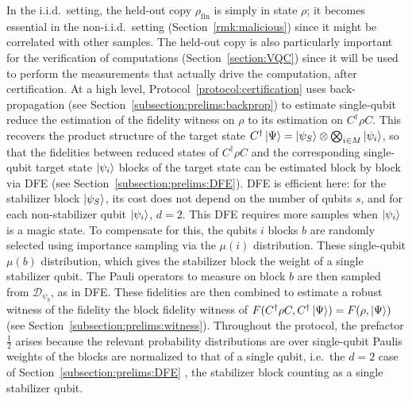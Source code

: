 \documentclass[a4paper,twocolumn,11pt,unpublished]{../../revision/quantumarticle}
\providecommand{\DIFadd}[1]{{\protect\color{blue} \sf #1}} %
\providecommand{\DIFdel}[1]{{\protect\color{red} \scriptsize #1}} %
\providecommand{\DIFaddbegin}{} %
\providecommand{\DIFaddend}{} %
\providecommand{\DIFdelbegin}{} %
\providecommand{\DIFdelend}{} %
\begin{document}
        In the i.i.d.\ setting, the held-out copy $\rho_{\mathrm{fin}}$ is simply in state $\rho$; it becomes essential in the non-i.i.d.\ setting (Section~\ref{rmk:malicious}) since it might be correlated with other samples. The held-out copy is also particularly important for the verification of computations (Section~\ref{section:VQC}) since it will be used to perform the measurements that actually drive the computation, after certification. At a high level, Protocol~\ref{protocol:certification} uses back-propagation (see Section~\ref{subsection:prelims:backprop}) to \DIFdelbegin \DIFdel{estimate single-qubit }\DIFdelend \DIFaddbegin \DIFadd{reduce the estimation of the fidelity witness on $\rho$ to its estimation on $C^\dag\rho C$. This recovers the product structure of the target state $C^\dag\ket\Psi=\ket{\psi_S}\otimes\bigotimes_{i\in M}\ket{\psi_i}$, so that the }\DIFaddend fidelities between reduced states of $C^\dag\rho C$ and the corresponding \DIFdelbegin \DIFdel{single-qubit target state $\ket{\psi_i}$ }\DIFdelend \DIFaddbegin \DIFadd{blocks of the target state can be estimated block by block }\DIFaddend via DFE (see Section~\ref{subsection:prelims:DFE}). \DIFaddbegin \DIFadd{DFE is efficient here: for the stabilizer block $\ket{\psi_S}$, its cost does not depend on the number of qubits $s$, and for each non-stabilizer qubit $\ket{\psi_i}$, $d=2$. }\DIFaddend This DFE requires more samples when $\ket{\psi_i}$ is a magic state. To compensate for this, the \DIFdelbegin \DIFdel{qubits $i$ }\DIFdelend \DIFaddbegin \DIFadd{blocks $b$ }\DIFaddend are randomly selected using importance sampling via the \DIFdelbegin \DIFdel{$\mu(i)$ distribution. These single-qubit }\DIFdelend \DIFaddbegin \DIFadd{$\mu(b)$ distribution, which gives the stabilizer block the weight of a single stabilizer qubit. The Pauli operators to measure on block $b$ are then sampled from $\mathcal{D}_{\psi_b}$, as in DFE. These }\DIFaddend fidelities are then combined to estimate \DIFdelbegin \DIFdel{a robust witness of the fidelity }\DIFdelend \DIFaddbegin \DIFadd{the block fidelity witness of }\DIFaddend $F(C^\dag\rho C,C^\dag\ket\Psi)=F(\rho,\ket\Psi)$ (see Section~\ref{subsection:prelims:witness}). Throughout the protocol, the prefactor $\tfrac12$ arises because the \DIFdelbegin \DIFdel{relevant probability distributions are over single-qubit Paulis}\DIFdelend \DIFaddbegin \DIFadd{weights of the blocks are normalized to that of a single qubit}\DIFaddend , i.e.\ the $d=2$ case of Section~\ref{subsection:prelims:DFE}\DIFaddbegin \DIFadd{, the stabilizer block counting as a single stabilizer qubit}\DIFaddend .
\end{document}

